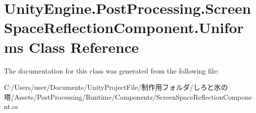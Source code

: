 \hypertarget{class_unity_engine_1_1_post_processing_1_1_screen_space_reflection_component_1_1_uniforms}{}\section{Unity\+Engine.\+Post\+Processing.\+Screen\+Space\+Reflection\+Component.\+Uniforms Class Reference}
\label{class_unity_engine_1_1_post_processing_1_1_screen_space_reflection_component_1_1_uniforms}


The documentation for this class was generated from the following file\+:\begin{DoxyCompactItemize}
\item 
C\+:/\+Users/user/\+Documents/\+Unity\+Project\+File/制作用フォルダ/しろと氷の塔/\+Assets/\+Post\+Processing/\+Runtime/\+Components/Screen\+Space\+Reflection\+Component.\+cs\end{DoxyCompactItemize}
